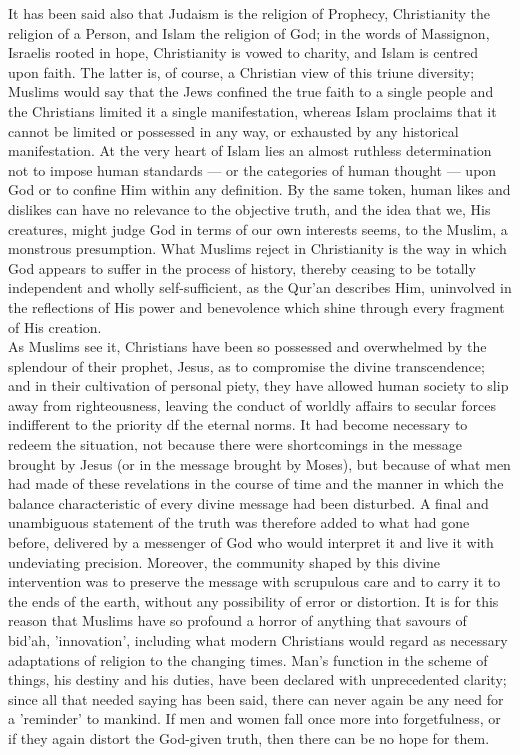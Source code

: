 \documentclass[10pt, twoside,openright]{book}
\begin{document}
It has been said also that Judaism is the religion of Prophecy, Christianity the religion of a 
Person, and Islam the religion of God; in the words of Massignon, Israelis rooted in hope, 
Christianity is vowed to charity, and Islam is centred upon faith. The latter is, of course, a 
Christian view of this triune diversity; Muslims would say that the Jews confined the true faith to a 
single people and the Christians limited it a single manifestation, whereas Islam proclaims that it 
cannot be limited or possessed in any way, or exhausted by any historical manifestation. At the very 
heart of Islam lies an almost ruthless determination not to impose human standards --- or the 
categories of human thought --- upon God or to confine Him within any definition. By the same token, 
human likes and dislikes can have no relevance to the objective truth, and the idea that we, His 
creatures, might judge God in terms of our own interests seems, to the Muslim, a monstrous 
presumption. What Muslims reject in Christianity is the way in which God appears to suffer in the 
process of history, thereby ceasing to be totally independent and wholly self\hyp{}sufficient, as the 
Qur'an describes Him, uninvolved in the reflections of His power and benevolence which shine through 
every fragment of His creation. \\

As Muslims see it, Christians have been so possessed and overwhelmed by the splendour of their 
prophet, Jesus, as to compromise the divine transcendence; and in their cultivation of personal 
piety, they have allowed human society to slip away from righteousness, leaving the conduct of 
worldly affairs to secular forces indifferent to the priority df the eternal norms. It had become 
necessary to redeem the situation, not because there were shortcomings in the message brought by 
Jesus (or in the message brought by Moses), but because of what men had made of these revelations in 
the course of time and the manner in which the balance characteristic of every divine message had 
been disturbed. A final and unambiguous statement of the truth was therefore added to what had gone 
before, delivered by a messenger of God who would interpret it and live it with undeviating 
precision. Moreover, the community shaped by this divine intervention was to preserve the message 
with scrupulous care and to carry it to the ends of the earth, without any possibility of error or 
distortion. It is for this reason that Muslims have so profound a horror of anything that savours of 
bid'ah, 'innovation', including what modern Christians would regard as necessary adaptations of 
religion to the changing times. Man's function in the scheme of things, his destiny and his duties, 
have been declared with unprecedented clarity; since all that needed saying has been said, there can 
never again be any need for a 'reminder' to mankind. If men and women fall once more into 
forgetfulness, or if they again distort the God\hyp{}given truth, then there can be no hope for them. \\
\end{document}
